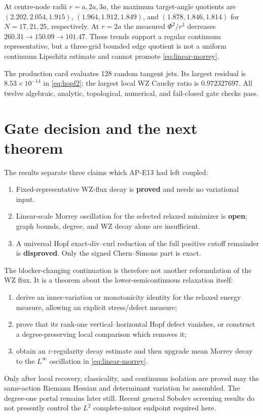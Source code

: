 \documentclass[11pt]{article}
\begin{document}
At centre-node radii $r=a,2a,3a$, the maximum target-angle quotients are
$(2.202,2.054,1.915)$, $(1.964,1.912,1.849)$, and
$(1.878,1.846,1.814)$ for $N=17,21,25$, respectively.  At $r=2a$ the measured
$\Phi^2/r^3$ decreases $260.31\to150.09\to101.47$.  These trends support a
regular continuum representative, but a three-grid bounded edge quotient is
not a uniform continuum Lipschitz estimate and cannot promote
\eqref{eq:linear-morrey}.

The production card evaluates 128 random tangent jets.  Its largest residual
is $8.53\times10^{-14}$ in \eqref{eq:hopf2}; the largest local WZ Cauchy ratio
is $0.972327697$.  All twelve algebraic, analytic, topological, numerical,
and fail-closed gate checks pass.

\section{Gate decision and the next theorem}

The results separate three claims which AP-E13 had left coupled:
\begin{enumerate}
 \item Fixed-representative WZ-flux decay is \textbf{proved} and needs no
       variational input.
 \item Linear-scale Morrey oscillation for the selected relaxed minimizer is
       \textbf{open}; graph bounds, degree, and WZ decay alone are
       insufficient.
 \item A universal Hopf exact-div--curl reduction of the full positive cutoff
       remainder is \textbf{disproved}.  Only the signed Chern--Simons part is
       exact.
\end{enumerate}

The blocker-changing continuation is therefore not another reformulation of
the WZ flux.  It is a theorem about the lower-semicontinuous relaxation
itself:
\begin{enumerate}
 \item derive an inner-variation or monotonicity identity for the relaxed
       energy measure, allowing an explicit stress/defect measure;
 \item prove that its rank-one vertical--horizontal Hopf defect vanishes, or
       construct a degree-preserving local comparison which removes it;
 \item obtain an $\varepsilon$-regularity decay estimate and then upgrade
       mean Morrey decay to the $L^\infty$ oscillation in
       \eqref{eq:linear-morrey}.
\end{enumerate}
Only after local recovery, classicality, and continuum isolation are proved
may the same-action Riemann Hessian and determinant variation be assembled.
The degree-one portal remains later still.  Recent general Sobolev screening
results \cite{BousquetPonceVanSchaftingen2025} do not presently control the
$L^2$ complete-minor endpoint required here.
\end{document}
